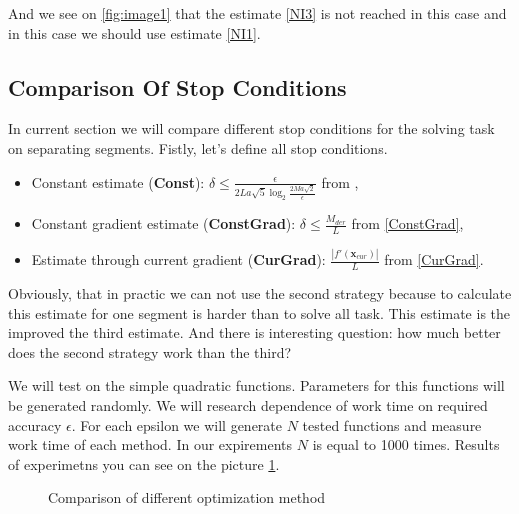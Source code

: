 \documentclass[12pt]{article}
\begin{document}
And we see on \ref{fig:image1} that the estimate \ref{NI3} is not reached in this case and in this case we should use estimate \ref{NI1}.

\subsection{Comparison Of Stop Conditions}

In current section we will compare different stop conditions for the solving task on separating segments. Fistly, let's define all stop conditions.

\begin{itemize}
	\item Constant estimate (\textbf{Const}): $\delta \leq \frac{\epsilon}{2La\sqrt{5}\log_2\frac{2Ma\sqrt{2}}{\epsilon}}$ from \cite{Ston_Pas},
	\item Constant gradient estimate (\textbf{ConstGrad}): $\delta \leq \frac{M_{der}}{L}$ from \ref{ConstGrad},
	\item Estimate through current gradient (\textbf{CurGrad}): $\frac{|f'(\textbf{x}_{cur})|}{L}$ from \ref{CurGrad}.
\end{itemize}

Obviously, that in practic we can not use the second strategy because to calculate this estimate for one segment is harder than to solve all task. This estimate is the improved the third estimate. And there is interesting question: how much better does the second strategy work than the third?

We will test on the simple quadratic functions. Parameters for this functions will be generated randomly. We will research dependence of work time on required accuracy $\epsilon$. For each epsilon we will generate $N$ tested functions and measure work time of each method. In our expirements $N$ is equal to 1000 times. Results of experimetns you can see on the picture \ref{res}.

\begin{figure}[h!]
\label{res}
 \caption{Comparison of different optimization method}
\end{figure}
\end{document}
